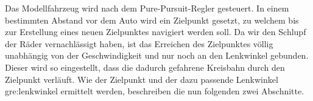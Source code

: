 Das Modellfahrzeug wird nach dem \glqq Pure-Pursuit\grqq-Regler gesteuert. In einem bestimmten Abstand vor dem Auto wird ein Zielpunkt gesetzt, zu welchem bis zur Erstellung eines neuen Zielpunktes navigiert werden soll. Da wir den Schlupf der Räder vernachlässigt haben, ist das Erreichen des Zielpunktes völlig unabhängig von der Geschwindigkeit und nur noch an den Lenkwinkel gebunden. Dieser wird so eingestellt, dass die dadurch gefahrene Kreisbahn durch den Zielpunkt verläuft. Wie der Zielpunkt und der dazu passende Lenkwinkel \gls{gre:lenkwinkel} ermittelt werden, beschreiben die nun folgenden zwei Abschnitte.
